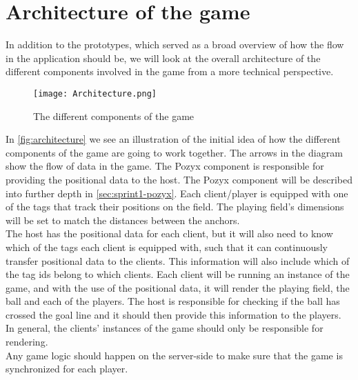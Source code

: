 \section{Architecture of the game}\label{sec:sprint1-architecture}
In addition to the prototypes, which served as a broad overview of how the flow in the application should be, we will look at the overall architecture of the different components involved in the game from a more technical perspective.
\begin{figure}[H]
    \centering
    \texttt{[image: Architecture.png]}
    \caption{The different components of the game}
    \label{fig:architecture}
\end{figure}
\noindent
In \autoref{fig:architecture} we see an illustration of the initial idea of how the different components of the game are going to work together.
The arrows in the diagram show the flow of data in the game.
The Pozyx component is responsible for providing the positional data to the host.
The Pozyx component will be described into further depth in \autoref{sec:sprint1-pozyx}.
Each client/player is equipped with one of the tags that track their positions on the field. 
The playing field's dimensions will be set to match the distances between the anchors. \\
The host has the positional data for each client, but it will also need to know which of the tags each client is equipped with, such that it can continuously transfer positional data to the clients.
This information will also include which of the tag ids belong to which clients.
Each client will be running an instance of the game, and with the use of the positional data, it will render the playing field, the ball and each of the players.
The host is responsible for checking if the ball has crossed the goal line and it should then provide this information to the players.
In general, the clients' instances of the game should only be responsible for rendering. \\
Any game logic should happen on the server-side to make sure that the game is synchronized for each player. 
